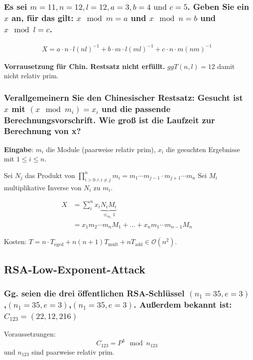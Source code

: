 \subsubsection{Es sei $m = 11, n = 12, l = 12, a = 3, b = 4 \text{ und } c=5$. Geben Sie ein $x$ an, für das
gilt: $x \mod m = a$ und $x \mod n = b$ und $x \mod l = c$.}

\begin{align}
 X = a \cdot n \cdot l (nl)^{-1}
   + b \cdot m \cdot l (ml)^{-1}
   + c \cdot n \cdot m (nm)^{-1}
\end{align}

\textbf{Vorrausetzung für Chin. Restsatz nicht erfüllt.}
$ggT(n,l)=12$ damit nicht relativ prim.

\subsubsection{Verallgemeinern Sie den Chinesischer Restsatz:
Gesucht ist $x$ mit $(x \mod m_i)=x_i$ und die passende Berechnungsvorschrift. Wie groß ist die Laufzeit zur Berechnung von x?}

\textbf{Eingabe}: $m_i$ die Module (paarweise relativ prim), $x_i$ die gesuchten Ergebnisse mit $1 \le i \le n$. 

Sei $N_j$ das Produkt von $ \prod_{i>0 \wedge i \ne j}^{n} m_i = 
	m_1 \cdots m_{j-1} \cdot m_{j+1} \cdots m_n$	
Sei $M_i$ multiplikative Inverse von $N_i$ zu $m_i$.

\begin{align}
	X &= \sum_{i}^{n} x_i \underbrace{N_i M_i}_{\equiv_{m_i} 1} \\
	  &= x_1 m_2 \cdots m_n M_1 + \ldots + x_n m_1 \cdots m_{n-1} M_n	
\end{align}

Kosten: $T = n \cdot T_{\text{egcd}} + n (n+1) T_{\text{mult}} + n T_{\text{add}} \in \mathcal{O}(n^2)$.

\subsection{RSA-Low-Exponent-Attack}
\subsubsection{Gg. seien die drei öffentlichen RSA-Schlüssel $(n_1 = 35,e=3)$,$(n_1 = 35,e=3)$,$(n_1 = 35,e=3)$.
Außerdem bekannt ist: $C_{123}=(22,12,216)$}

Voraussetzungen: 
	$$ C_{123} = P^3 \mod n_{123} $$
und $n_{123}$ sind paarweise relativ prim.

